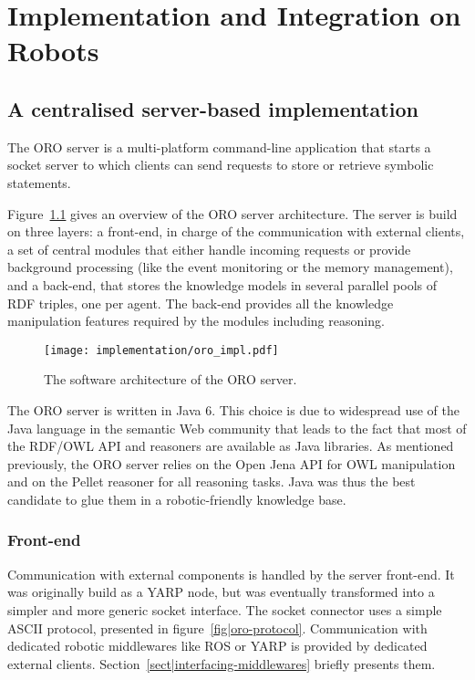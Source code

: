 \chapter{Implementation and Integration on Robots}
\label{chapt|implementation-integration}

\section{A centralised server-based implementation}
\label{sect|oro-server-impl}

The ORO server is a multi-platform command-line application that starts a
socket server to which clients can send requests to store or retrieve symbolic
statements.

Figure~\ref{fig|oro-impl} gives an overview of the ORO server architecture. The
server is build on three layers: a front-end, in charge of the communication
with external clients, a set of central modules that either handle incoming
requests or provide background processing (like the event monitoring or the
memory management), and a back-end, that stores the knowledge models in several
parallel pools of RDF triples, one per agent. The back-end provides all the
knowledge manipulation features required by the modules including
reasoning.

\begin{figure}
    \centering
    \texttt{[image: implementation/oro\_impl.pdf]}
    \caption{The software architecture of the ORO server.}
    \label{fig|oro-impl}
\end{figure}


The ORO server is written in Java 6. This choice is due to widespread use of
the Java language in the semantic Web community that leads to the fact that
most of the RDF/OWL API and reasoners are available as Java libraries. As
mentioned previously, the ORO server relies on the Open Jena API for OWL
manipulation and on the Pellet reasoner for all reasoning tasks. Java was thus
the best candidate to glue them in a robotic-friendly knowledge base.

\subsection{Front-end}
\label{sect|frontend}

Communication with external components is handled by the server front-end.  It
was originally build as a YARP node, but was eventually transformed into a
simpler and more generic socket interface.  The socket connector uses a simple
ASCII protocol, presented in figure~\ref{fig|oro-protocol}.  Communication with
dedicated robotic middlewares like ROS or YARP is provided by dedicated
external clients. Section~\ref{sect|interfacing-middlewares} briefly presents
them.

